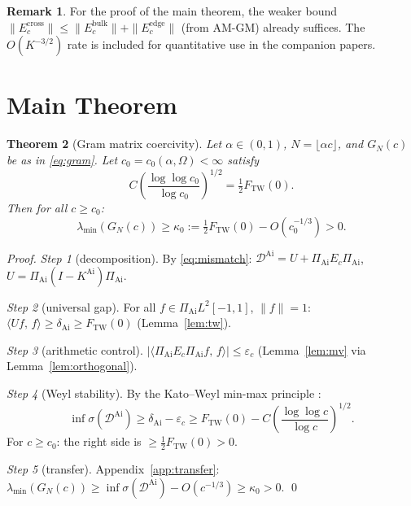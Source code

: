 \documentclass[12pt,a4paper]{amsart}
\newtheorem{theorem}{Theorem}[section]
\theoremstyle{definition}
\newtheorem{remark}[theorem]{Remark}
\newcommand{\KAi}{K^{\mathrm{Ai}}}
\newcommand{\DAi}{\mathcal{D}^{\mathrm{Ai}}}
\newcommand{\PAi}{\Pi_{\mathrm{Ai}}}
\newcommand{\GN}{G_N(c)}
\newcommand{\Ec}{E_c}
\newcommand{\norm}[1]{\|#1\|}
\newcommand{\ip}[2]{\langle #1,\, #2 \rangle}
\newcommand{\spec}{\sigma}
\newcommand{\FTW}{F_{\mathrm{TW}}(0)}
\newcommand{\dAi}{\delta_{\mathrm{Ai}}}
\begin{document}
\begin{remark}
For the proof of the main theorem, the weaker bound
$\norm{\Ec^{\mathrm{cross}}} \le \norm{\Ec^{\mathrm{bulk}}} + \norm{\Ec^{\mathrm{edge}}}$
(from AM-GM) already suffices.
The $O(K^{-3/2})$ rate is included for quantitative use in the companion papers.
\end{remark}

\section{Main Theorem}
\label{sec:main}

\begin{theorem}[Gram matrix coercivity]\label{thm:P13}
Let $\alpha \in (0,1)$, $N = \lfloor\alpha c\rfloor$,
and $\GN$ be as in \eqref{eq:gram}.
Let $c_0 = c_0(\alpha,\Omega) < \infty$ satisfy
\begin{equation}\label{eq:c0}
  C\left(\frac{\log\log c_0}{\log c_0}\right)^{1/2} = \tfrac{1}{2}\FTW.
\end{equation}
Then for all $c \ge c_0$:
\begin{equation}\label{eq:main}
  \lambda_{\min}(\GN)
  \ge \kappa_0 := \tfrac{1}{2}\FTW - O(c_0^{-1/3})
  > 0.
\end{equation}
\end{theorem}

\begin{proof}
\emph{Step 1} (decomposition).
By \eqref{eq:mismatch}: $\DAi = U + \PAi\Ec\PAi$,
$U = \PAi(I-\KAi)\PAi$.

\emph{Step 2} (universal gap).
For all $f \in \PAi L^2[-1,1]$, $\norm{f}=1$:
$\ip{Uf}{f} \ge \dAi \ge \FTW$ (Lemma~\ref{lem:tw}).

\emph{Step 3} (arithmetic control).
$|\ip{\PAi\Ec\PAi f}{f}| \le \varepsilon_c$
(Lemma~\ref{lem:mv} via Lemma~\ref{lem:orthogonal}).

\emph{Step 4} (Weyl stability).
By the Kato--Weyl min-max principle \cite{Kato1966}:
\begin{equation}
  \inf\spec(\DAi)
  \ge \dAi - \varepsilon_c
  \ge \FTW - C\!\left(\frac{\log\log c}{\log c}\right)^{1/2}.
\end{equation}
For $c \ge c_0$: the right side is $\ge \tfrac{1}{2}\FTW > 0$.

\emph{Step 5} (transfer).
Appendix~\ref{app:transfer}:
$\lambda_{\min}(\GN) \ge \inf\spec(\DAi) - O(c^{-1/3}) \ge \kappa_0 > 0$. \qed
\end{proof}
\end{document}
